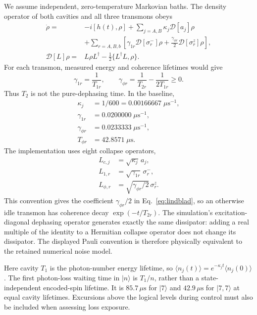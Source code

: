 \documentclass[aps,prb,reprint,amsmath,amssymb,nofootinbib]{revtex4-2}
\newcommand{\ket}[1]{\lvert#1\rangle}
\newcommand{\Diss}[1]{\mathcal{D}[#1]}
\begin{document}
We assume independent, zero-temperature Markovian baths. The density
operator of both cavities and all three transmons obeys\cite{Lindblad1976}
\begin{align}
 \dot\rho={}&-i[h(t),\rho]
       +\sum_{j=A,B}\kappa_j\Diss{a_j}\rho\nonumber\\
 &+\sum_{r=A,B,b}\left[
       \gamma_{1r}\Diss{\sigma_r^-}\rho
       +\frac{\gamma_{\phi r}}{2}\Diss{\sigma_r^z}\rho
       \right],
 \label{eq:lindblad}\\
 \Diss{L}\rho={}&L\rho L^\dagger-\frac12\{L^\dagger L,\rho\}.
\end{align}
For each transmon, measured energy and coherence lifetimes would give
\begin{equation}
 \gamma_{1r}=\frac1{T_{1r}},\qquad
 \gamma_{\phi r}=\frac1{T_{2r}}-\frac1{2T_{1r}}\geq0.
 \label{eq:rates}
\end{equation}
Thus $T_2$ is not the pure-dephasing time. In the baseline,
\begin{align}
 \kappa_j&=1/600=0.00166667\;\mu\mathrm{s}^{-1},\\
 \gamma_{1r}&=0.0200000\;\mu\mathrm{s}^{-1},\\
 \gamma_{\phi r}&=0.0233333\;\mu\mathrm{s}^{-1},\\
 T_{\phi r}&=42.8571\;\mu\mathrm{s}.
\end{align}
The implementation uses eight collapse operators,
\begin{align}
 L_{c,j}&=\sqrt{\kappa_j}\,a_j,\\
 L_{1,r}&=\sqrt{\gamma_{1r}}\,\sigma_r^-,\\
 L_{\phi,r}&=\sqrt{\gamma_{\phi r}/2}\,\sigma_r^z .
 \label{eq:collapse}
\end{align}
This convention gives the coefficient $\gamma_{\phi r}/2$ in
Eq.~\eqref{eq:lindblad}, so an otherwise idle transmon has coherence
decay $\exp(-t/T_{2r})$. The simulation's excitation-diagonal dephasing
operator generates exactly the same dissipator: adding a real multiple
of the identity to a Hermitian collapse operator does not change its
dissipator. The displayed Pauli convention is therefore physically
equivalent to the retained numerical noise model.

Here cavity $T_1$ is the photon-number energy lifetime, so
$\langle n_j(t)\rangle=e^{-\kappa_jt}\langle n_j(0)\rangle$.
The first photon-loss waiting time in $\ket n$ is $T_1/n$, rather than a
state-independent encoded-spin lifetime. It is $85.7\,\mu\mathrm{s}$ for
$\ket7$ and $42.9\,\mu\mathrm{s}$ for $\ket{7,7}$ at equal cavity
lifetimes. Excursions above the logical levels during control must also
be included when assessing loss exposure.
\end{document}
